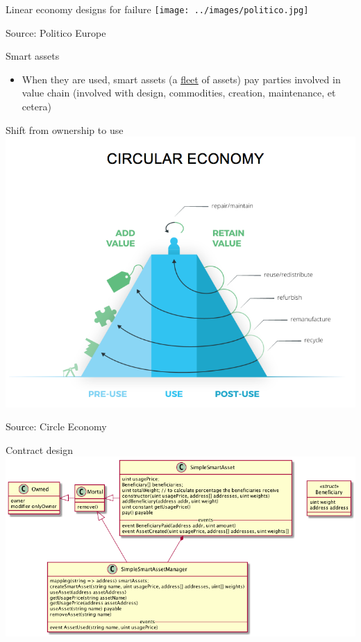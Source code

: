 \documentclass[presentation]{beamer}
\begin{document}
\begin{frame}[label=sec-3-4]{Linear economy designs for failure}
\texttt{[image: ../images/politico.jpg]}

Source: Politico Europe
\end{frame}

\begin{frame}[label=sec-3-5]{Smart assets}
\begin{itemize}
\item When they are used, \alert{smart assets} (a \alert{\uline{fleet}} of assets) pay parties
involved in value chain (involved with design, commodities, creation,
maintenance, et cetera)
\end{itemize}
\end{frame}

\begin{frame}[label=sec-3-6]{Shift from ownership to use}
\includegraphics[width=.9\linewidth]{../images/circulareconomy.png}

Source: Circle Economy
\end{frame}

\begin{frame}[label=sec-3-7]{Contract design}
\includegraphics[width=.9\linewidth]{../images/fleet.png}
\end{frame}
\end{document}
